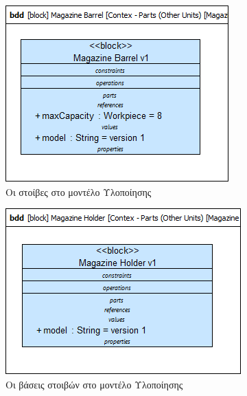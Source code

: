 \documentclass[a4paper,12pt,twoside]{report}
\begin{document}
\begin{appendices}
				\begin{figure}[hp]
					\centering
					\includegraphics[scale=0.50]{DesignModel_Contex-Parts(OtherUnits)[MagazineBarrel].png}
					\caption{Οι στοίβες στο μοντέλο Υλοποίησης}
					\label{φωτ:Οι στοίβες στο μοντέλο Υλοποίησης}
				\end{figure}
				
				\begin{figure}[hp]
					\centering
					\includegraphics[scale=0.50]{DesignModel_Contex-Parts(OtherUnits)[MagazineHolder].png}
					\caption{Οι βάσεις στοιβών στο μοντέλο Υλοποίησης}
					\label{φωτ:Οι βάσεις στοιβών στο μοντέλο Υλοποίησης}
				\end{figure}
				

\end{appendices}
\end{document}
